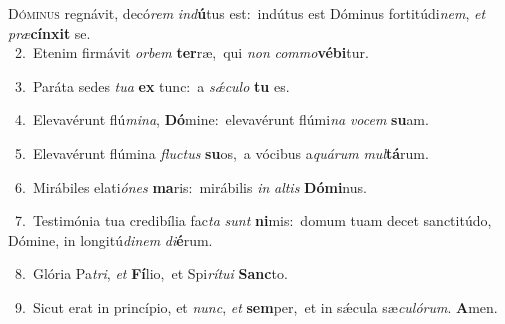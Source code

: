\lettrine{\initial\textcolor{\initialcolor}{D}}{óminus} regnávit, decó\textit{rem} \textit{ind}\-\textbf{ú}tus est:~\star indútus est Dóminus fortitúdi\-\textit{nem}\-, \textit{et} \textit{præ}\-\textbf{cín}\textbf{xit} se.\\
{\numbfont\textcolor{\numbcolor}{~2.}}~Etenim firmávit \textit{or}\-\textit{bem} \textbf{ter}\-ræ,~\star qui \textit{non} \textit{com}\-\textit{mo}\textbf{vé}\textbf{bi}tur.\par
{\numbfont\textcolor{\numbcolor}{~3.}}~Paráta sedes \textit{tu}\-\textit{a} \textbf{ex} tunc:~\star a \textit{sǽ}\-\textit{cu}\textit{lo} \textbf{tu} es.\par
{\numbfont\textcolor{\numbcolor}{~4.}}~Elevavérunt flú\-\textit{mi}\-\textit{na}, \textbf{Dó}\-mine:~\star elevavérunt flúmi\textit{na} \textit{vo}\-\textit{cem} \textbf{su}\-am.\par
{\numbfont\textcolor{\numbcolor}{~5.}}~Elevavérunt flúmina \textit{fluc}\-\textit{tus} \textbf{su}\-os,~\star a vócibus a\-\textit{quá}\-\textit{rum} \textit{mul}\-\textbf{tá}rum.\par
{\numbfont\textcolor{\numbcolor}{~6.}}~Mirábiles elati\-\textit{ó}\-\textit{nes} \textbf{ma}\-ris:~\star mirábilis \textit{in} \textit{al}\-\textit{tis} \textbf{Dó}\-\textbf{mi}nus.\par
{\numbfont\textcolor{\numbcolor}{~7.}}~Testimónia tua credibília fac\textit{ta} \textit{sunt} \textbf{ni}\-mis:~\star domum tuam decet sanctitúdo, Dómine, in longitú\-\textit{di}\-\textit{nem} \textit{di}\-\textbf{é}rum.\par
{\numbfont\textcolor{\numbcolor}{~8.}}~Glória Pa\-\textit{tri}\-, \textit{et} \textbf{Fí}\-lio,~\star et Spi\-\textit{rí}\-\textit{tu}\textit{i} \textbf{Sanc}\-to.\par
{\numbfont\textcolor{\numbcolor}{~9.}}~Sicut erat in princípio, et \textit{nunc}\-, \textit{et} \textbf{sem}\-per,~\star et in sǽcula sæ\-\textit{cu}\-\textit{ló}\textit{rum}. \textbf{A}\-men.\par
